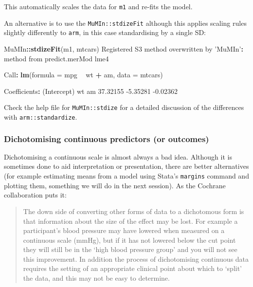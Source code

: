 \documentclass[]{article}
\newenvironment{Shaded}{\begin{snugshade}}{\end{snugshade}}
\newcommand{\DataTypeTok}[1]{\textcolor[rgb]{0.13,0.29,0.53}{#1}}
\newcommand{\FloatTok}[1]{\textcolor[rgb]{0.00,0.00,0.81}{#1}}
\newcommand{\KeywordTok}[1]{\textcolor[rgb]{0.13,0.29,0.53}{\textbf{#1}}}
\newcommand{\NormalTok}[1]{#1}
\newcommand{\OperatorTok}[1]{\textcolor[rgb]{0.81,0.36,0.00}{\textbf{#1}}}
\newcommand{\StringTok}[1]{\textcolor[rgb]{0.31,0.60,0.02}{#1}}
\begin{document}
This automatically scales the data for \texttt{m1} and re-fits the model.

An alternative is to use the \texttt{MuMIn::stdizeFit} although this applies scaling
rules slightly differently to \texttt{arm}, in this case standardising by a single SD:

\begin{Shaded}
\begin{Highlighting}[]
\NormalTok{MuMIn}\OperatorTok{::}\KeywordTok{stdizeFit}\NormalTok{(m1, mtcars)}
\NormalTok{Registered S3 method overwritten by }\StringTok{'MuMIn'}\OperatorTok{:}
\StringTok{  }\NormalTok{method         from}
\NormalTok{  predict.merMod lme4}

\NormalTok{Call}\OperatorTok{:}
\KeywordTok{lm}\NormalTok{(}\DataTypeTok{formula =}\NormalTok{ mpg }\OperatorTok{~}\StringTok{ }\NormalTok{wt }\OperatorTok{+}\StringTok{ }\NormalTok{am, }\DataTypeTok{data =}\NormalTok{ mtcars)}

\NormalTok{Coefficients}\OperatorTok{:}
\NormalTok{(Intercept)           wt           am  }
   \FloatTok{37.32155}     \FloatTok{-5.35281}     \FloatTok{-0.02362}  
\end{Highlighting}
\end{Shaded}

Check the help file for \texttt{MuMIn::stdize} for a detailed discussion of the
differences with \texttt{arm::standardize}.

\hypertarget{dichotomising}{%
\subsubsection*{Dichotomising continuous predictors (or outcomes)}\label{dichotomising}}

Dichotomising a continuous scale is almost always a bad idea. Although it is
sometimes done to aid interpretation or presentation, there are better
alternatives (for example estimating means from a model using Stata's \texttt{margins}
command and plotting them, something we will do in the next session). As the
Cochrane collaboration puts it:

\begin{quote}
The down side of converting other forms of data to a dichotomous form is that
information about the size of the effect may be lost. For example a
participant's blood pressure may have lowered when measured on a continuous
scale (mmHg), but if it has not lowered below the cut point they will still be
in the `high blood pressure group' and you will not see this improvement. In
addition the process of dichotomising continuous data requires the setting of
an appropriate clinical point about which to `split' the data, and this may
not be easy to determine.
\end{quote}
\end{document}
